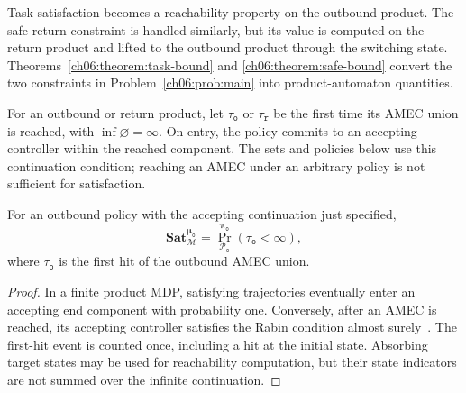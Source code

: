Task satisfaction becomes a reachability property on the outbound product.
The safe-return constraint is handled similarly, but its value is computed on
the return product and lifted to the outbound product through the switching
state. Theorems~\ref{ch06:theorem:task-bound} and
\ref{ch06:theorem:safe-bound} convert the two constraints in
Problem~\ref{ch06:prob:main} into product-automaton quantities.

\begin{revision}
For an outbound or return product, let $\tau_{\texttt o}$ or
$\tau_{\texttt r}$ be the first time its AMEC union is reached, with
$\inf\varnothing=\infty$. On entry, the policy commits to an accepting
controller within the reached component. The sets and policies below use
this continuation condition; reaching an AMEC under an arbitrary policy is
not sufficient for satisfaction.

\begin{theorem}
\label{ch06:theorem:task-bound}
For an outbound policy with the accepting continuation just specified,
\begin{equation}
\label{ch06:eq:theo-sat-bound}
\textbf{Sat}_{\mathcal M}^{\boldsymbol\mu_{\texttt o}}
=\Pr_{\mathcal P_{\texttt o}}^{\boldsymbol\pi_{\texttt o}}
(\tau_{\texttt o}<\infty),
\end{equation}
where $\tau_{\texttt o}$ is the first hit of the outbound AMEC union.
\end{theorem}
\begin{proof}
In a finite product MDP, satisfying trajectories eventually enter an
accepting end component with probability one. Conversely, after an AMEC is
reached, its accepting controller satisfies the Rabin condition almost
surely~\citep{baier2008principles,guo2018probabilistic}.
The first-hit event is counted once, including a hit at the initial state.
Absorbing target states may be used for reachability computation, but their
state indicators are not summed over the infinite continuation.
\end{proof}


\end{revision}

